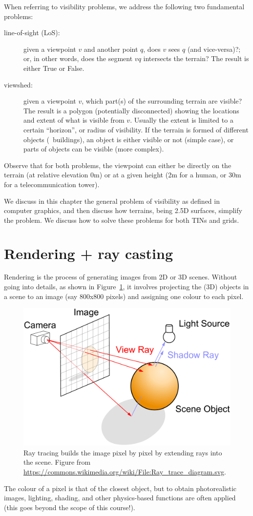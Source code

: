 %

When referring to visibility problems, we address the following two fundamental problems:
\begin{description}
  \item[line-of-sight (LoS):] given a viewpoint $v$ and another point $q$, does $v$ sees $q$ (and vice-versa)?; or, in other words, does the segment $vq$ intersects the terrain? The result is either True or False.
  \item[viewshed:] given a viewpoint $v$, which part(s) of the surrounding terrain are visible? The result is a polygon (potentially disconnected) showing the locations and extent of what is visible from $v$. Usually the extent is limited to a certain ``horizon'', or radius of visibility. If the terrain is formed of different objects (\eg\ buildings), an object is either visible or not (simple case), or parts of objects can be visible (more complex).
\end{description}
Observe that for both problems, the viewpoint can either be directly on the terrain (at relative elevation 0m) or at a given height (2m for a human, or 30m for a telecommunication tower).

%

We discuss in this chapter the general problem of visibility as defined in computer graphics, and then discuss how terrains, being 2.5D surfaces, simplify the problem.
We discuss how to solve these problems for both TINs and grids.




%
\section{Rendering + ray casting}

Rendering is the process of generating images from 2D or 3D scenes.
Without going into details, as shown in Figure~\ref{fig:Ray_trace_diagram}, it involves projecting the (3D) objects in a scene to an image (say 800x800 pixels) and assigning one colour to each pixel.
\begin{figure}
  \centering
  \includegraphics[width=0.6\linewidth]{figs/Ray_trace_diagram.pdf}
  \caption{Ray tracing builds the image pixel by pixel by extending rays into the scene. Figure from \url{https://commons.wikimedia.org/wiki/File:Ray_trace_diagram.svg}.}
\label{fig:Ray_trace_diagram}
\end{figure}
The colour of a pixel is that of the closest object, but to obtain photorealistic images, lighting, shading, and other physics-based functions are often applied (this goes beyond the scope of this course!).

